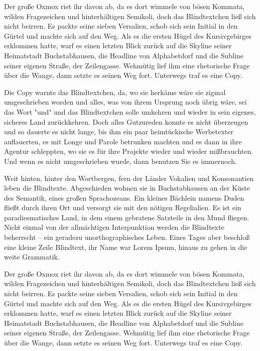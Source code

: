 Der große Oxmox riet ihr davon ab, da es dort wimmele von bösen Kommata, wilden Fragezeichen und hinterhältigen Semikoli, doch das Blindtextchen ließ sich nicht beirren. Es packte seine sieben Versalien, schob sich sein Initial in den Gürtel und machte sich auf den Weg. Als es die ersten Hügel des Kursivgebirges erklommen hatte, warf es einen letzten Blick zurück auf die Skyline seiner Heimatstadt Buchstabhausen, die Headline von Alphabetdorf und die Subline seiner eigenen Straße, der Zeilengasse. Wehmütig lief ihm eine rhetorische Frage über die Wange, dann setzte es seinen Weg fort. Unterwegs traf es eine Copy.

Die Copy warnte das Blindtextchen, da, wo sie herkäme wäre sie zigmal umgeschrieben worden und alles, was von ihrem Ursprung noch übrig wäre, sei das Wort "und" und das Blindtextchen solle umkehren und wieder in sein eigenes, sicheres Land zurückkehren. Doch alles Gutzureden konnte es nicht überzeugen und so dauerte es nicht lange, bis ihm ein paar heimtückische Werbetexter auflauerten, es mit Longe und Parole betrunken machten und es dann in ihre Agentur schleppten, wo sie es für ihre Projekte wieder und wieder mißbrauchten. Und wenn es nicht umgeschrieben wurde, dann benutzen Sie es immernoch.

Weit hinten, hinter den Wortbergen, fern der Länder Vokalien und Konsonantien leben die Blindtexte. Abgeschieden wohnen sie in Buchstabhausen an der Küste des Semantik, eines großen Sprachozeans. Ein kleines Bächlein namens Duden fließt durch ihren Ort und versorgt sie mit den nötigen Regelialien. Es ist ein paradiesmatisches Land, in dem einem gebratene Satzteile in den Mund fliegen. Nicht einmal von der allmächtigen Interpunktion werden die Blindtexte beherrscht – ein geradezu unorthographisches Leben. Eines Tages aber beschloß eine kleine Zeile Blindtext, ihr Name war Lorem Ipsum, hinaus zu gehen in die weite Grammatik.

Der große Oxmox riet ihr davon ab, da es dort wimmele von bösen Kommata, wilden Fragezeichen und hinterhältigen Semikoli, doch das Blindtextchen ließ sich nicht beirren. Es packte seine sieben Versalien, schob sich sein Initial in den Gürtel und machte sich auf den Weg. Als es die ersten Hügel des Kursivgebirges erklommen hatte, warf es einen letzten Blick zurück auf die Skyline seiner Heimatstadt Buchstabhausen, die Headline von Alphabetdorf und die Subline seiner eigenen Straße, der Zeilengasse. Wehmütig lief ihm eine rhetorische Frage über die Wange, dann setzte es seinen Weg fort. Unterwegs traf es eine Copy.


